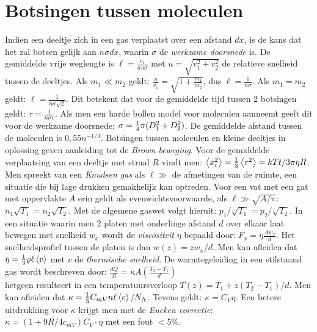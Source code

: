 \section{Botsingen tussen moleculen}
Indien een deeltje zich in een gas verplaatst over een afstand $dx$, is de
kans dat het zal botsen gelijk aan $n\sigma dx$, waarin $\sigma$ de
{\it werkzame doorsnede} is. De gemiddelde vrije weglengte is
$\displaystyle\ell=\frac{v_1}{nu\sigma}$ met $u=\sqrt{v_1^2+v_2^2}$ de relatieve
snelheid tussen de deeltjes. Als $m_1\ll m_2$ geldt:
$\displaystyle\frac{u}{v_1}=\sqrt{1+\frac{m_1}{m_2}}$, dus
$\displaystyle\ell=\frac{1}{n\sigma}$. Als $m_1=m_2$ geldt:
$\displaystyle\ell=\frac{1}{n\sigma\sqrt{2}}$. Dit betekent dat voor de
gemiddelde tijd tussen 2 botsingen geldt: $\displaystyle\tau=\frac{1}{n\sigma v}$.
Als men een harde bollen model voor moleculen aanneemt geeft dit voor de
werkzame doorsnede: $\sigma=\mbox{$\frac{1}{4}$}\pi(D_1^2+D_2^2)$. De gemiddelde afstand
tussen de moleculen is $0,55n^{-1/3}$. Botsingen tussen moleculen en
kleine deeltjes in oplossing geven aanleiding tot de {\it Brown beweging}.
Voor de gemiddelde verplaatsing van een deeltje met straal $R$ vindt men:
$\left\langle x_i^2 \right\rangle=\frac{1}{3}\left\langle r^2 \right\rangle=kTt/3\pi\eta R$.
\npar
Men spreekt van een {\it Knudsen gas} als $\ell\gg$ de afmetingen van de
ruimte, een situatie die bij lage drukken gemakkelijk kan optreden. Voor een
vat met een gat met oppervlakte $A$ erin geldt als evenwichtsvoorwaarde,
als $\ell\gg\sqrt{A/\pi}$: $n_1\sqrt{T_1}=n_2\sqrt{T_2}$. Met de algemene
gaswet volgt hieruit: $p_1/\sqrt{T_1}=p_2/\sqrt{T_2}$.
\npar
In een situatie waarin men 2 platen met onderlinge afstand $d$ over elkaar
laat bewegen met snelheid $w_x$ wordt de {\it viscositeit} $\eta$ bepaald
door: $\displaystyle F_x=\eta\frac{Aw_x}{d}$. Het snelheidsprofiel tussen de
platen is dan $w(z)=zw_x/d$. Men kan afleiden dat
$\eta=\frac{1}{3}\varrho\ell\left\langle v \right\rangle$ met $v$ de {\it thermische snelheid}.
\npar
De warmtegeleiding in een stilstaand gas wordt beschreven door:
$\displaystyle\frac{dQ}{dt}=\kappa A\left(\frac{T_2-T_1}{d}\right)$\\
hetgeen resulteert in een temperatuursverloop $T(z)=T_1+z(T_2-T_1)/d$. Men kan
afleiden dat $\kappa=\frac{1}{3}C_{mV}n\ell\left\langle v \right\rangle/N_{\rm A}$. Tevens geldt:
$\kappa=C_V\eta$. Een betere uitdrukking voor $\kappa$ krijgt men met de
{\it Eucken correctie}: $\kappa=(1+9R/4c_{mV})C_V\cdot\eta$ met een fout $<$5\%.

